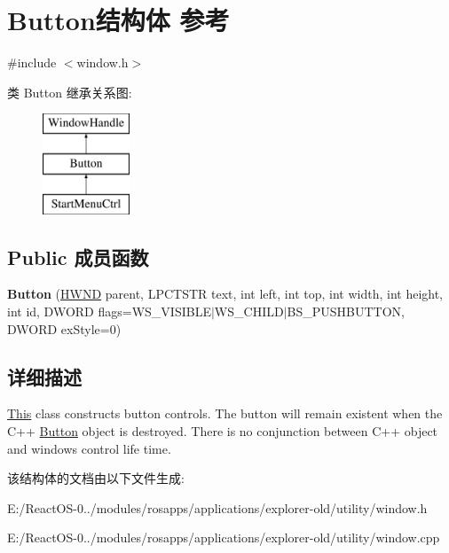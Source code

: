 \hypertarget{struct_button}{}\section{Button结构体 参考}
\label{struct_button}


{\ttfamily \#include $<$window.\+h$>$}

类 Button 继承关系图\+:\begin{figure}[H]
\begin{center}
\leavevmode
\includegraphics[height=3.000000cm]{struct_button}
\end{center}
\end{figure}
\subsection*{Public 成员函数}
\begin{DoxyCompactItemize}
\item 
\mbox{\label{struct_button_a59cba8b466525a9ffc2193e227465bb5}} 
{\bfseries Button} (\hyperlink{interfacevoid}{H\+W\+ND} parent, L\+P\+C\+T\+S\+TR text, int left, int top, int width, int height, int id, D\+W\+O\+RD flags=W\+S\+\_\+\+V\+I\+S\+I\+B\+LE$\vert$W\+S\+\_\+\+C\+H\+I\+LD$\vert$B\+S\+\_\+\+P\+U\+S\+H\+B\+U\+T\+T\+ON, D\+W\+O\+RD ex\+Style=0)
\end{DoxyCompactItemize}


\subsection{详细描述}
\hyperlink{namespace_this}{This} class constructs button controls. The button will remain existent when the C++ \hyperlink{struct_button}{Button} object is destroyed. There is no conjunction between C++ object and windows control life time. 

该结构体的文档由以下文件生成\+:\begin{DoxyCompactItemize}
\item 
E\+:/\+React\+O\+S-\/0../modules/rosapps/applications/explorer-\/old/utility/window.\+h\item 
E\+:/\+React\+O\+S-\/0../modules/rosapps/applications/explorer-\/old/utility/window.\+cpp\end{DoxyCompactItemize}
